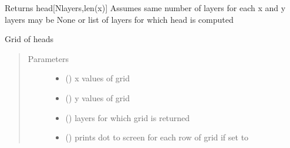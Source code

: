 \documentclass[letterpaper,10pt,english]{sphinxmanual}
\begin{document}
\begin{fulllineitems}
\begin{fulllineitems}
\begin{quote}
\begin{description}
\end{description}\end{quote}

\end{fulllineitems}


\begin{fulllineitems}
\label{\detokenize{models/model3d:timml.model.Model3D.headalongline}}
Returns head{[}Nlayers,len(x){]}
Assumes same number of layers for each x and y
layers may be None or list of layers for which head is computed

\end{fulllineitems}


\begin{fulllineitems}
\label{\detokenize{models/model3d:timml.model.Model3D.headgrid}}
Grid of heads
\begin{quote}\begin{description}
\item[{Parameters}] \leavevmode\begin{itemize}
\item {} 
 () \textendash{} x values of grid

\item {} 
 () \textendash{} y values of grid

\item {} 
 (\sphinxstyleliteralemphasis{, }\sphinxstyleliteralemphasis{, }) \textendash{} layers for which grid is returned

\item {} 
 (\sphinxstyleliteralemphasis{, }) \textendash{} prints dot to screen for each row of grid if set to 

\end{itemize}


\end{description}
\end{quote}
\end{fulllineitems}
\end{fulllineitems}
\end{document}
